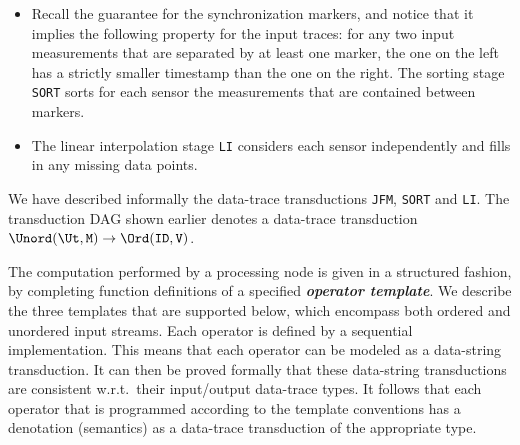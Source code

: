 \begin{example}
\begin{itemize}
\item
Recall the guarantee for the synchronization markers, and notice that it implies the following property for the input traces: for any two input measurements that are separated by at least one marker, the one on the left has a strictly smaller timestamp than the one on the right. The sorting stage \texttt{SORT} sorts for each sensor the measurements that are contained between markers.
\item
The linear interpolation stage \texttt{LI} considers each sensor independently and fills in any missing data points.
\end{itemize}
We have described informally the data-trace transductions \texttt{JFM}, \texttt{SORT} and \texttt{LI}. The transduction DAG shown earlier denotes a data-trace transduction $\Unord(\Ut,\texttt{M}) \to \Ord(\texttt{ID},\texttt{V})$.
\end{example}

The computation performed by a processing node is given in a structured fashion, by completing function definitions of a specified \textbf{\em operator template}. We describe the three templates that are supported below, which encompass both ordered and unordered input streams. Each operator is defined by a sequential implementation. This means that each operator can be modeled as a data-string transduction. It can then be proved formally that these data-string transductions are consistent w.r.t.\ their input/output data-trace types. It follows that each operator that is programmed according to the template conventions has a denotation (semantics) as a data-trace transduction of the appropriate type.

